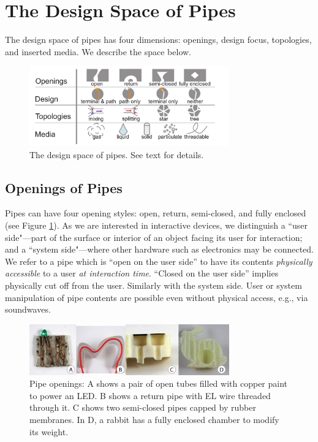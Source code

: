 \section{The Design Space of Pipes}
The design space of pipes has four dimensions: openings, design focus, topologies, and inserted media.  We describe the space below.

\begin{figure}[h!]
\centering
    \includegraphics[width=3.4in]{figures/tubespace.pdf}
\caption{The design space of pipes.  See text for details.}
\label{fig:pipespace}
\end{figure}

\subsection{Openings of Pipes}

Pipes can have four opening styles: open, return, semi-closed, and fully enclosed (see Figure \ref{fig:pipespace}).  As we are interested in interactive devices, we distinguish a ``user side"---part of the surface or interior of an object facing its user for interaction; and a ``system side"---where other hardware such as electronics may be connected.  We refer to a pipe which is ``open on the user side'' to have its contents \emph{physically accessible} to a user \emph{at interaction time}.  ``Closed on the user side'' implies physically cut off from the user.  Similarly with the system side.  User or system manipulation of pipe contents are possible even without physical access, e.g., via soundwaves. 

\begin{figure}[h]
\centering
    \includegraphics[width=3.4in]{figures/types.png}
\caption{Pipe openings: A shows a pair of open tubes filled with copper paint to power an LED.  B shows a return pipe with EL wire threaded through it.  C shows two semi-closed pipes capped by rubber membranes.  In D, a rabbit has a fully enclosed chamber to modify its weight.}
\label{fig:openings}
\end{figure}

